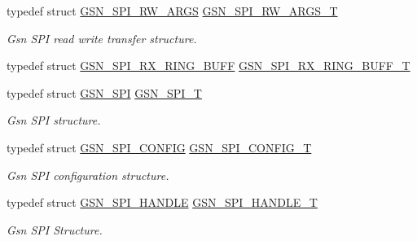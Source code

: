 \begin{DoxyCompactItemize}
typedef struct \hyperlink{a00239}{GSN\_\-SPI\_\-RW\_\-ARGS} \hyperlink{a00655_ga9da696c71bee0cdc5b3365d5d055e389}{GSN\_\-SPI\_\-RW\_\-ARGS\_\-T}
\begin{DoxyCompactList}\small\item\em Gsn SPI read write transfer structure. \end{DoxyCompactList}\item 
typedef struct \hyperlink{a00240}{GSN\_\-SPI\_\-RX\_\-RING\_\-BUFF} \hyperlink{a00587_a5884b8b45a9dd074d8fb6610ed9cd935}{GSN\_\-SPI\_\-RX\_\-RING\_\-BUFF\_\-T}
\item 
typedef struct \hyperlink{a00230}{GSN\_\-SPI} \hyperlink{a00655_ga18a5a1252fa65289699c9caa71d05fca}{GSN\_\-SPI\_\-T}
\begin{DoxyCompactList}\small\item\em Gsn SPI structure. \end{DoxyCompactList}\item 
typedef struct \hyperlink{a00231}{GSN\_\-SPI\_\-CONFIG} \hyperlink{a00655_ga582e2b85ccb404b546fbe5a27f2113cb}{GSN\_\-SPI\_\-CONFIG\_\-T}
\begin{DoxyCompactList}\small\item\em Gsn SPI configuration structure. \end{DoxyCompactList}\item 
typedef struct \hyperlink{a00238}{GSN\_\-SPI\_\-HANDLE} \hyperlink{a00655_ga046c33438e29676344675866f7935308}{GSN\_\-SPI\_\-HANDLE\_\-T}
\begin{DoxyCompactList}\small\item\em Gsn SPI Structure. \end{DoxyCompactList}\end{DoxyCompactItemize}
